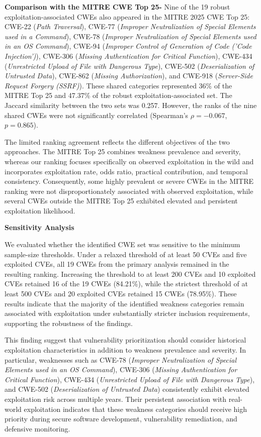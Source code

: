 \documentclass[conference,compsoc]{IEEEtran}
\begin{document}
\textbf{Comparison with the MITRE CWE Top 25-} Nine of the 19 robust exploitation-associated CWEs also appeared in the MITRE 2025 CWE Top 25: CWE-22 (\emph{Path Traversal}), CWE-77 (\emph{Improper Neutralization of Special Elements used in a Command}), CWE-78 (\emph{Improper Neutralization of Special Elements used in an OS Command}), CWE-94 (\emph{Improper Control of Generation of Code ('Code Injection')}), CWE-306 (\emph{Missing Authentication for Critical Function}), CWE-434 (\emph{Unrestricted Upload of File with Dangerous Type}), CWE-502 (\emph{Deserialization of Untrusted Data}), CWE-862 (\emph{Missing Authorization}), and CWE-918 (\emph{Server-Side Request Forgery (SSRF)}). These shared categories represented 36\% of the MITRE Top 25 and 47.37\% of the robust exploitation-associated set. The Jaccard similarity between the two sets was 0.257. However, the ranks of the nine shared CWEs were not significantly correlated (Spearman's $\rho=-0.067$, $p=0.865$).

The limited ranking agreement reflects the different objectives of the two approaches. The MITRE Top 25 combines weakness prevalence and severity, whereas our ranking focuses specifically on observed exploitation in the wild and incorporates exploitation rate, odds ratio, practical contribution, and temporal consistency. Consequently, some highly prevalent or severe CWEs in the MITRE ranking were not disproportionately associated with observed exploitation, while several CWEs outside the MITRE Top 25 exhibited elevated and persistent exploitation likelihood.

\textbf{Sensitivity Analysis}

We evaluated whether the identified CWE set was sensitive to the minimum sample-size thresholds. Under a relaxed threshold of at least 50 CVEs and five exploited CVEs, all 19 CWEs from the primary analysis remained in the resulting ranking. Increasing the threshold to at least 200 CVEs and 10 exploited CVEs retained 16 of the 19 CWEs (84.21\%), while the strictest threshold of at least 500 CVEs and 20 exploited CVEs retained 15 CWEs (78.95\%). These results indicate that the majority of the identified weakness categories remain associated with exploitation under substantially stricter inclusion requirements, supporting the robustness of the findings.

This finding suggest that vulnerability prioritization should consider historical exploitation characteristics in addition to weakness prevalence and severity. In particular, weaknesses such as CWE-78 (\emph{Improper Neutralization of Special Elements used in an OS Command}), CWE-306 (\emph{Missing Authentication for Critical Function}), CWE-434 (\emph{Unrestricted Upload of File with Dangerous Type}), and CWE-502 (\emph{Deserialization of Untrusted Data}) consistently exhibit elevated exploitation risk across multiple years. Their persistent association with real-world exploitation indicates that these weakness categories should receive high priority during secure software development, vulnerability remediation, and defensive monitoring.
\end{document}
